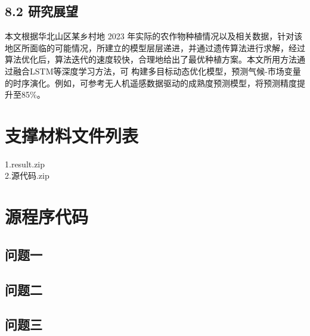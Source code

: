 \documentclass[12pt]{article}
\begin{document}
\subsection{8.2 研究展望}
本文根据华北山区某乡村地 2023 年实际的农作物种植情况以及相关数据，针对该地区所面临的可能情况，所建立的模型层层递进，并通过遗传算法进行求解，经过算法优化后，算法迭代的速度较快，合理地给出了最优种植方案。本文所用方法通过融合LSTM等深度学习方法，可 构建多目标动态优化模型，预测气候-市场变量的时序演化。例如，可参考无人机遥感数据驱动的成熟度预测模型\cite{zhao2023}，将预测精度提升至85\%。


\printbibliography
\begin{appendix}
\section{支撑材料文件列表}
1.result.zip\\
2.源代码.zip
\section{源程序代码}
\subsection{问题一}

\subsection{问题二}

\subsection{问题三}

\end{appendix}
\end{document}
